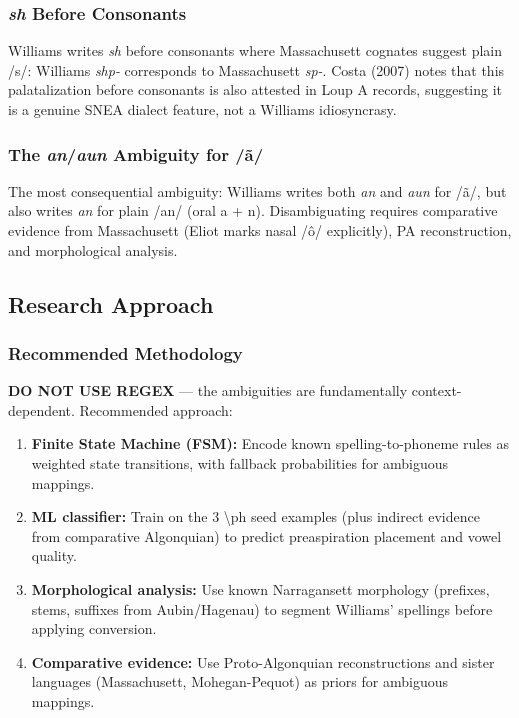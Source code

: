 \subsubsection{\textit{sh} Before Consonants}

Williams writes \textit{sh} before consonants where Massachusett cognates
suggest plain /s/: Williams \textit{shp-} corresponds to Massachusett
\textit{sp-}. Costa (2007) notes that this palatalization before consonants is
also attested in Loup A records, suggesting it is a genuine SNEA dialect
feature, not a Williams idiosyncrasy.

\subsubsection{The \textit{an}/\textit{aun} Ambiguity for /ã/}

The most consequential ambiguity: Williams writes both \textit{an} and
\textit{aun} for /ã/, but also writes \textit{an} for plain /an/ (oral a + n).
Disambiguating requires comparative evidence from Massachusett (Eliot marks
nasal /ô/ explicitly), PA reconstruction, and morphological analysis.

\subsection{Research Approach}

\subsubsection{Recommended Methodology}

\textbf{DO NOT USE REGEX} --- the ambiguities are fundamentally
context-dependent. Recommended approach:

\begin{enumerate}
  \item \textbf{Finite State Machine (FSM):} Encode known spelling-to-phoneme
    rules as weighted state transitions, with fallback probabilities for
    ambiguous mappings.
  \item \textbf{ML classifier:} Train on the 3 \textbackslash ph seed examples
    (plus indirect evidence from comparative Algonquian) to predict
    preaspiration placement and vowel quality.
  \item \textbf{Morphological analysis:} Use known Narragansett morphology
    (prefixes, stems, suffixes from Aubin/Hagenau) to segment Williams'
    spellings before applying conversion.
  \item \textbf{Comparative evidence:} Use Proto-Algonquian reconstructions
    and sister languages (Massachusett, Mohegan-Pequot) as priors for
    ambiguous mappings.
\end{enumerate}

